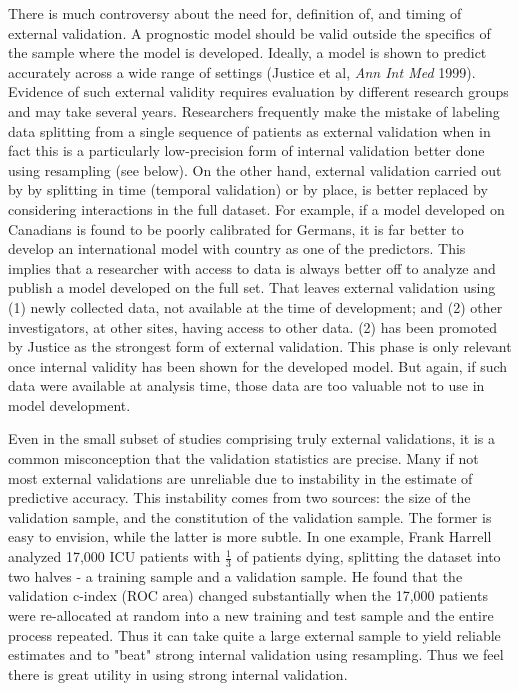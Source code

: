 {\smaller
There is much controversy about the need for, definition of, and
timing of external validation.
A prognostic model should be valid outside the specifics of the sample
where the model is developed. Ideally, a model is shown to predict
accurately across a wide range of settings (Justice et al, \emph{Ann Int
		Med} 1999).  Evidence of such external validity requires evaluation by
different research groups and may take several years.  Researchers
frequently make the mistake of labeling data splitting from a single
sequence of patients as external validation when in fact this is a
particularly low-precision form of internal validation better done
using resampling (see below).  On the other hand, external validation
carried out by by splitting in time (temporal validation) or by place,
is better replaced by considering interactions in the full dataset.  For
example, if a model developed on Canadians is found to be poorly
calibrated for Germans, it is far better to develop an international
model with country as one of the predictors.  This implies that a
researcher with access to data is always better off to analyze and
publish a model developed on the full set.  That leaves external
validation using (1) newly collected data, not available at the time
of development; and (2) other investigators, at other sites, having
access to other data. (2) has been promoted by Justice as the
strongest form of external validation.  This phase is only relevant
once internal validity has been shown for the developed model.  But
again, if such data were available at analysis time, those data are
too valuable not to use in model development.

Even in the small subset of studies comprising truly external
validations, it is a common misconception that the validation statistics
are precise.  Many if not most external validations are unreliable due to
instability in the estimate of predictive accuracy.  This instability
comes from two sources: the size of the validation sample, and the
constitution of the validation sample.  The former is easy to
envision, while the latter is more subtle.  In one example, Frank
Harrell analyzed 17,000 ICU patients with $\frac{1}{3}$ of patients dying,
splitting the dataset into two halves - a training sample and a
validation sample.  He found that the validation c-index (ROC area)
changed substantially when the 17,000 patients were re-allocated at
random into a new training and test sample and the entire process
repeated.  Thus it can take quite a large external sample to yield
reliable estimates and to "beat" strong internal validation using
resampling.  Thus we feel there is great utility in using strong
internal validation.

}
